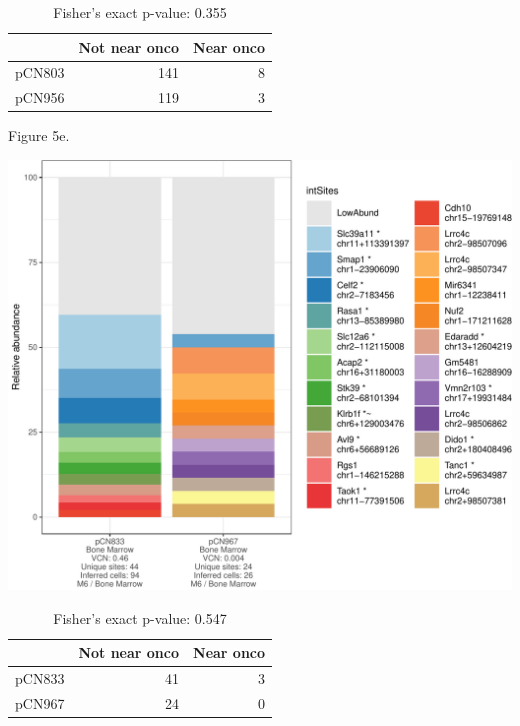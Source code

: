 \documentclass[12pt,]{article}
\begin{document}
\begin{table}[!h]

\caption{\label{tab:unnamed-chunk-5}Fisher's exact p-value: 0.355}
\centering
\begin{tabular}[t]{lrr}
\toprule
  & Not near onco & Near onco\\
\midrule
pCN803 & 141 & 8\\
pCN956 & 119 & 3\\
\bottomrule
\end{tabular}
\end{table}

\newpage

Figure 5e.

\includegraphics{project.group2_files/figure-latex/unnamed-chunk-5-5.pdf}
\vspace{1.0cm}

\begin{table}[!h]

\caption{\label{tab:unnamed-chunk-5}Fisher's exact p-value: 0.547}
\centering
\begin{tabular}[t]{lrr}
\toprule
  & Not near onco & Near onco\\
\midrule
pCN833 & 41 & 3\\
pCN967 & 24 & 0\\
\bottomrule
\end{tabular}
\end{table}

\newpage

\newpage
\end{document}
